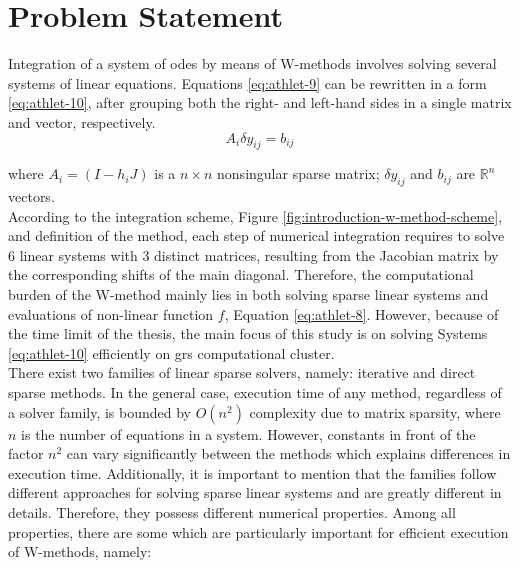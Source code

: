 \chapter{Problem Statement}\label{chapter:problem-statment}


Integration of a system of \acrshort{ode}s by means of W-methods involves solving  several systems of linear equations. Equations \ref{eq:athlet-9} can be rewritten in a form \ref{eq:athlet-10}, after grouping both the right- and left-hand sides in a single matrix and vector, respectively.\\



\begin{equation} \label{eq:athlet-10}
	A_{i} \delta y_{ij} =  b_{ij} 
\end{equation}


where $A_{i} = (I - h_{i}J)$  is a $n \times n$ nonsingular sparse matrix; $\delta y_{ij}$  and $b_{ij}$ are $\mathbb{R}^{n}$ vectors.\\


According to the integration scheme, Figure \ref{fig:introduction-w-method-scheme}, and definition of the method, each step of numerical integration requires to solve 6 linear systems with 3 distinct matrices, resulting from the Jacobian matrix by the corresponding shifts of the main diagonal. Therefore, the computational burden of the W-method mainly lies in both solving sparse linear systems and evaluations of non-linear function $f$, Equation \ref{eq:athlet-8}. However, because of the time limit of the thesis, the main focus of this study is on solving Systems \ref{eq:athlet-10} efficiently on \acrshort{grs} computational cluster.\\


There exist two families of linear sparse solvers, namely: iterative and direct sparse methods. In the general case, execution time of any method, regardless of a solver family, is bounded by $O(n^2)$ complexity due to matrix sparsity, where $n$ is the number of equations in a system. However, constants in front of the factor $n^2$ can vary significantly between the methods which explains differences in execution time. Additionally, it is important to mention that the families follow different approaches for solving sparse linear systems and are greatly different in details. Therefore, they possess different numerical properties. Among all  properties, there are some which are particularly important for efficient execution of W-methods, namely: \\


